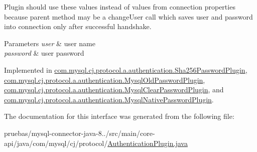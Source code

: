Plugin should use these values instead of values from connection properties because parent method may be a change\+User call which saves user and password into connection only after successful handshake.


\begin{DoxyParams}{Parameters}
{\em user} & user name \\
\hline
{\em password} & user password \\
\hline
\end{DoxyParams}


Implemented in \mbox{\hyperlink{classcom_1_1mysql_1_1cj_1_1protocol_1_1a_1_1authentication_1_1_sha256_password_plugin_a3094a9ba3e8a9543ec5e4d89bbb23d47}{com.\+mysql.\+cj.\+protocol.\+a.\+authentication.\+Sha256\+Password\+Plugin}}, \mbox{\hyperlink{classcom_1_1mysql_1_1cj_1_1protocol_1_1a_1_1authentication_1_1_mysql_old_password_plugin_a0d3234b9087f06e3d10a3fe13566c6a8}{com.\+mysql.\+cj.\+protocol.\+a.\+authentication.\+Mysql\+Old\+Password\+Plugin}}, \mbox{\hyperlink{classcom_1_1mysql_1_1cj_1_1protocol_1_1a_1_1authentication_1_1_mysql_clear_password_plugin_aac79ca0c6d0e4fd7207f2de8e6f1e6a8}{com.\+mysql.\+cj.\+protocol.\+a.\+authentication.\+Mysql\+Clear\+Password\+Plugin}}, and \mbox{\hyperlink{classcom_1_1mysql_1_1cj_1_1protocol_1_1a_1_1authentication_1_1_mysql_native_password_plugin_a24947d4cf7090930c52d6451e87c027f}{com.\+mysql.\+cj.\+protocol.\+a.\+authentication.\+Mysql\+Native\+Password\+Plugin}}.



The documentation for this interface was generated from the following file\+:\begin{DoxyCompactItemize}
\item 
pruebas/mysql-\/connector-\/java-\/8../src/main/core-\/api/java/com/mysql/cj/protocol/\mbox{\hyperlink{_authentication_plugin_8java}{Authentication\+Plugin.\+java}}\end{DoxyCompactItemize}
